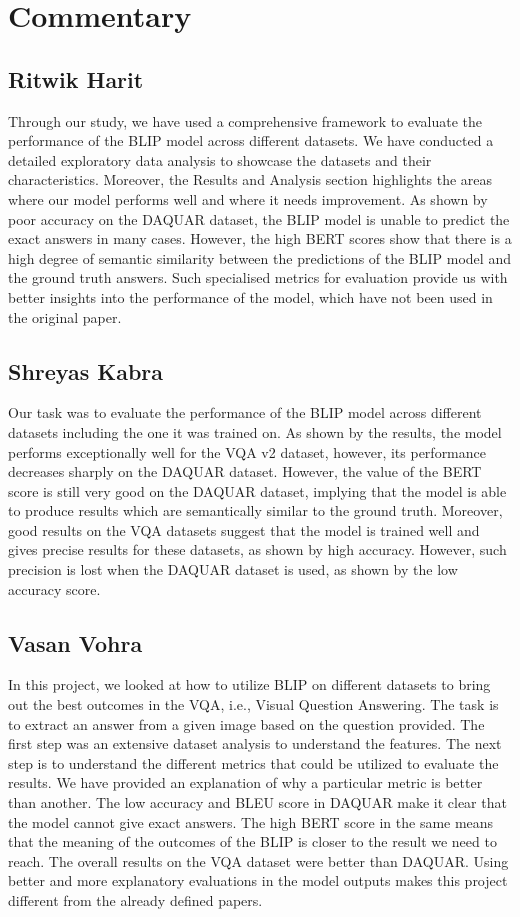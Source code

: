 \section{Commentary}
\label{sec:formatting}

\subsection{Ritwik Harit}
Through our study, we have used a comprehensive framework to evaluate the performance of the BLIP model across different datasets. We have conducted a detailed exploratory data analysis to showcase the datasets and their characteristics. Moreover, the Results and Analysis section highlights the areas where our model performs well and where it needs improvement. As shown by poor accuracy on the DAQUAR dataset, the BLIP model is unable to predict the exact answers in many cases. However, the high BERT scores show that there is a high degree of semantic similarity between the predictions of the BLIP model and the ground truth answers. Such specialised metrics for evaluation provide us with better insights into the performance of the model, which have not been used in the original paper.
\subsection{Shreyas Kabra}
Our task was to evaluate the performance of the BLIP model across different datasets including the one it was trained on. As shown by the results, the model performs exceptionally well for the VQA v2 dataset, however, its performance decreases sharply on the DAQUAR dataset. However, the value of the BERT score is still very good on the DAQUAR dataset, implying that the model is able to produce results which are semantically similar to the ground truth. Moreover, good results on the VQA datasets suggest that the model is trained well and gives precise results for these datasets, as shown by high accuracy. However, such precision is lost when the DAQUAR dataset is used, as shown by the low accuracy score. 
\subsection{Vasan Vohra}
In this project, we looked at how to utilize BLIP on different datasets to bring out the best outcomes in the VQA, i.e., Visual Question Answering. The task is to extract an answer from a given image based on the question provided. The first step was an extensive dataset analysis to understand the features. The next step is to understand the different metrics that could be utilized to evaluate the results. We have provided an explanation of why a particular metric is better than another. The low accuracy and BLEU score in DAQUAR make it clear that the model cannot give exact answers. The high BERT score in the same means that the meaning of the outcomes of the BLIP is closer to the result we need to reach. The overall results on the VQA dataset were better than DAQUAR. Using better and more explanatory evaluations in the model outputs makes this project different from the already defined papers.







